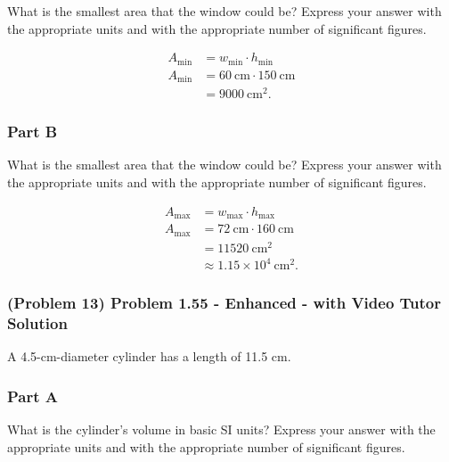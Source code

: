 What is the smallest area that the window could be? Express your answer with the appropriate units and with the appropriate number of significant figures.

\vspace{1em}

\begin{solution}
	\begin{align*}
		A_{\text{min}} &= w_{\text{min}} \cdot h_{\text{min}} \\
		A_{\text{min}} &= 60~\text{cm} \cdot 150~\text{cm} \\
		&= 9000~\text{cm}^2
		.\end{align*}
\end{solution}

\subsubsection{Part B}

What is the smallest area that the window could be? Express your answer with the appropriate units and with the appropriate number of significant figures.

\vspace{1em}

\begin{solution}
	\begin{align*}
		A_{\text{max}} &= w_{\text{max}} \cdot h_{\text{max}} \\
		A_{\text{max}} &= 72~\text{cm} \cdot 160~\text{cm} \\
		&= 11520~\text{cm}^2 \\
		&\approx 1.15 \times 10^{4}~\text{cm}^2
		.\end{align*}
\end{solution}

\newpage

\subsubsection{(Problem 13) Problem 1.55 - Enhanced - with Video Tutor Solution}

A 4.5-cm-diameter cylinder has a length of 11.5 cm.

\subsubsection{Part A}

What is the cylinder's volume in basic SI units? Express your answer with the appropriate units and with the appropriate number of significant figures.

